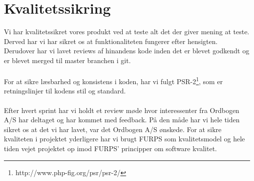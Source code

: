 \hypertarget{kvalitetssikring}{}
\section{Kvalitetssikring}
Vi har kvalitetssikret vores produkt ved at teste alt det der giver mening at teste.
Derved har vi har sikret os at funktionaliteten fungerer efter hensigten. Derudover har vi lavet reviews af hinandens kode inden
det er blevet godkendt og er blevet merged til master branchen i git.
\\\\
For at sikre læsbarhed og konsistens i koden, har vi fulgt PSR-2\footnote{http://www.php-fig.org/psr/psr-2/}, som er retningslinjer til kodens stil og standard.
\\\\
Efter hvert sprint har vi holdt et review møde hvor interessenter fra Ordbogen A/S har deltaget og har kommet med feedback.
På den måde har vi hele tiden sikret os at det vi har lavet, var det Ordbogen A/S ønskede.
For at sikre kvaliteten i projektet yderligere har vi brugt FURPS som kvalitetsmodel og hele tiden
vejet projektet op imod FURPS' principper om software kvalitet.
